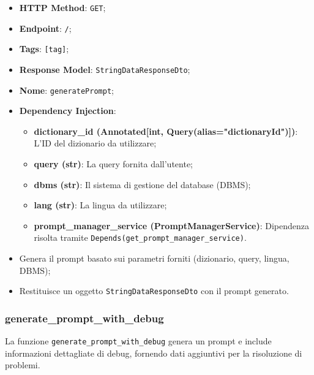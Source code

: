 \begin{itemize}
\item \textbf{HTTP Method}: \texttt{GET};
\item \textbf{Endpoint}: \texttt{/};
\item \textbf{Tags}: \texttt{[tag]};
\item \textbf{Response Model}: \texttt{StringDataResponseDto};
\item \textbf{Nome}: \texttt{generatePrompt};
\item \textbf{Dependency Injection}:
\begin{itemize}
\item \textbf{dictionary\_id (Annotated[int, Query(alias="dictionaryId")])}: L'ID del dizionario da utilizzare;
\item \textbf{query (str)}: La query fornita dall'utente;
\item \textbf{dbms (str)}: Il sistema di gestione del database (DBMS);
\item \textbf{lang (str)}: La lingua da utilizzare;
\item \textbf{prompt\_manager\_service (PromptManagerService)}: Dipendenza risolta tramite \texttt{Depends(get\_prompt\_manager\_service)}.
\end{itemize}
\end{itemize}

\begin{itemize}
\item Genera il prompt basato sui parametri forniti (dizionario, query, lingua, DBMS);
\item Restituisce un oggetto \texttt{StringDataResponseDto} con il prompt generato.
\end{itemize}

\subsubsection{generate\_prompt\_with\_debug}

\par La funzione \texttt{generate\_prompt\_with\_debug} genera un prompt e include informazioni dettagliate di debug, fornendo dati aggiuntivi per la risoluzione di problemi.

